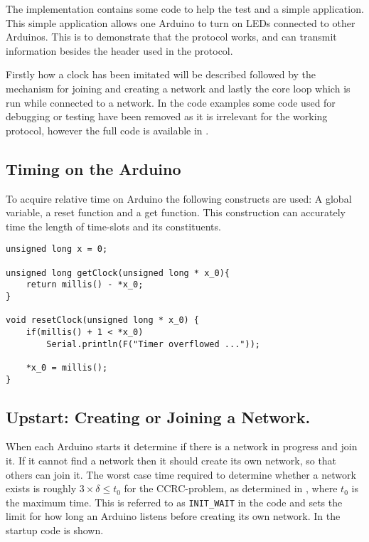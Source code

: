 \noindent
The implementation contains some code to help the test and a simple application. 
This simple application allows one Arduino to turn on LEDs connected to other Arduinos. 
This is to demonstrate that the protocol works, and can transmit information besides the header used in the protocol. 

Firstly how a clock has been imitated will be described followed by the mechanism for joining and creating a network and lastly the core loop which is run while connected to a network.
In the code examples some code used for debugging or testing have been removed as it is irrelevant for the working protocol, however the full code is available in . 

\subsection{Timing on the Arduino}
To acquire relative time on Arduino the following constructs are used: A global variable, a reset function and a get function. 
This construction can accurately time the length of time-slots and its constituents. 
\begin{lstlisting}[style=customc,caption={The variable and functions used to implement timing.},label={lst:ccrc:timing}]
unsigned long x = 0;

unsigned long getClock(unsigned long * x_0){
    return millis() - *x_0; 
}

void resetClock(unsigned long * x_0) {
    if(millis() + 1 < *x_0)
        Serial.println(F("Timer overflowed ..."));

    *x_0 = millis();
}
\end{lstlisting}

\subsection{Upstart: Creating or Joining a Network.}
When each Arduino starts it determine if there is a network in progress and join it. 
If it cannot find a network then it should create its own network, so that others can join it. 
The worst case time required to determine whether a network exists is roughly $3 \times \delta \leq t_0$ for the CCRC-problem, as determined in , where $t_0$ is the maximum time. 
This is referred to as \texttt{INIT\_WAIT} in the code and sets the limit for how long an Arduino listens before creating its own network. 
In  the startup code is shown. 

